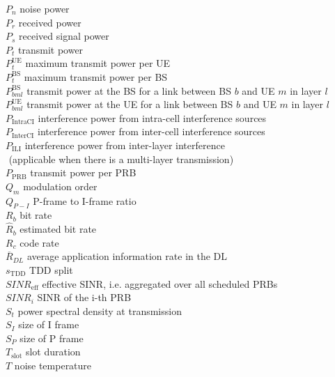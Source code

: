 $P_n$ \mytab noise power \\
$P_r$ \mytab received power \\
$P_s$ \mytab received signal power \\
$P_t$ \mytab transmit power \\
$P_t^\text{UE}$ \mytab maximum transmit power per UE\\
$P_t^\text{BS}$ \mytab maximum transmit power per BS \\
$P_{bml}^\text{BS}$ \mytab transmit power at the BS for a link between BS $b$ and UE $m$ in layer $l$ \\
$P_{bml}^\text{UE}$ \mytab transmit power at the UE for a link between BS $b$ and  UE $m$ in layer $l$ \\
$P_\text{IntraCI}$ \mytab interference power from intra-cell interference sources \\
$P_\text{InterCI}$ \mytab interference power from inter-cell interference sources \\
$P_\text{ILI}$ \mytab interference power from inter-layer interference \\
${ }$ \mytab (applicable when there is a multi-layer transmission) \\
$P_\text{PRB}$ \mytab transmit power per PRB \\

$Q_m$ \mytab modulation order \\
$Q_{P-I}$ \mytab P-frame to I-frame ratio \\

$R_b$ \mytab bit rate \\
$\hat{R}_b$ \mytab estimated bit rate \\
$R_c$ \mytab code rate \\
$\overline{R}_{DL}$ \mytab average application information rate in the \ac{DL}\\

$s_\text{TDD}$ \mytab TDD split \\
$SINR_\text{eff}$ \mytab effective SINR, i.e. aggregated over all scheduled PRBs \\
$SINR_i$ \mytab SINR of the i-th PRB \\
$S_t$ \mytab power spectral density at transmission\\
$S_I$ \mytab size of I frame\\
$S_P$ \mytab size of P frame\\

$T_\text{slot}$  \mytab slot duration \\
$T$ \mytab noise temperature\\

